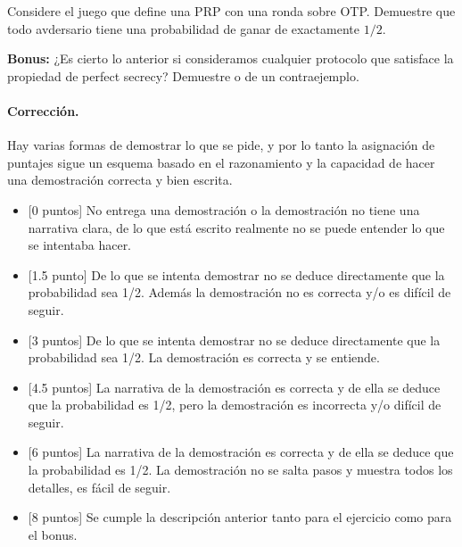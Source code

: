 
Considere el juego que define una PRP con una ronda sobre OTP. Demuestre que todo avdersario tiene una probabilidad de ganar de exactamente $1/2$.

{\bf Bonus:} ¿Es cierto lo anterior si consideramos cualquier protocolo que satisface la propiedad de perfect secrecy? Demuestre o de un contraejemplo.

\medskip

\paragraph{Corrección.} Hay varias formas de demostrar lo que se pide, y por lo tanto la asignación de puntajes sigue un esquema basado en el razonamiento y la capacidad de hacer una demostración correcta y bien escrita.

\begin{itemize}
  \item{[0 puntos]} No entrega una demostración o la demostración no tiene una narrativa clara, de lo que está escrito realmente no se puede entender lo que se intentaba hacer.
  \item{[1.5 punto]} De lo que se intenta demostrar no se deduce directamente que la probabilidad sea 1/2. Además la demostración no es correcta y/o es difícil de seguir.
  \item{[3 puntos]} De lo que se intenta demostrar no se deduce directamente que la probabilidad sea 1/2. La demostración es correcta y se entiende.
  \item{[4.5 puntos]} La narrativa de la demostración es correcta y de ella se deduce que la probabilidad es 1/2, pero la demostración es incorrecta y/o difícil de seguir.
  \item{[6 puntos]} La narrativa de la demostración es correcta y de ella se deduce que la probabilidad es 1/2. La demostración no se salta pasos y muestra todos los detalles, es fácil de seguir.
  \item{[8 puntos]} Se cumple la descripción anterior tanto para el ejercicio como para el bonus.
\end{itemize}

\medskip
